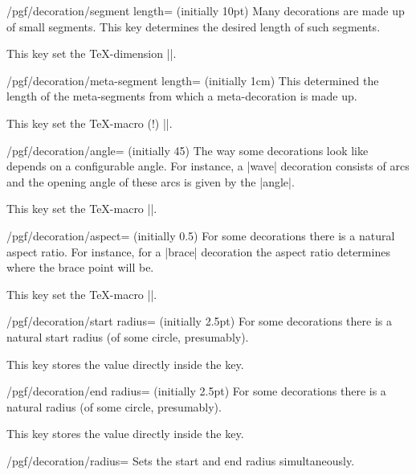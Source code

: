 \begin{key}{/pgf/decoration/segment length= (initially 10pt)}
  Many decorations are made up of small segments. This key determines
  the desired length of such segments.

  This key set the \TeX-dimension |\pgfdecorationsegmentlength|.
\end{key}

\begin{key}{/pgf/decoration/meta-segment length= (initially 1cm)}
  This determined the length of the meta-segments from which a
  meta-decoration is made up.

  This key set the \TeX-macro (!) |\pgfmetadecorationsegmentlength|.
\end{key}

\begin{key}{/pgf/decoration/angle= (initially 45)}
  The way some decorations look like depends on a configurable angle. For
  instance, a |wave| decoration consists of arcs and the opening angle
  of these arcs is given by the |angle|.

  This key set the \TeX-macro |\pgfdecorationsegmentangle|.
\end{key}

\begin{key}{/pgf/decoration/aspect= (initially 0.5)}
  For some decorations there is a natural aspect ratio. For instance,
  for a |brace| decoration the aspect ratio determines where the brace
  point will be.

  This key set the \TeX-macro |\pgfdecorationsegmentaspect|.
\end{key}

\begin{key}{/pgf/decoration/start radius= (initially 2.5pt)}
  For some decorations there is a natural start radius (of some circle, presumably).

  This key stores the value directly inside the key.
\end{key}

\begin{key}{/pgf/decoration/end radius= (initially 2.5pt)}
  For some decorations there is a natural radius (of some circle, presumably).

  This key stores the value directly inside the key.
\end{key}

\begin{stylekey}{/pgf/decoration/radius=}
  Sets the start and end radius simultaneously.
\end{stylekey}


